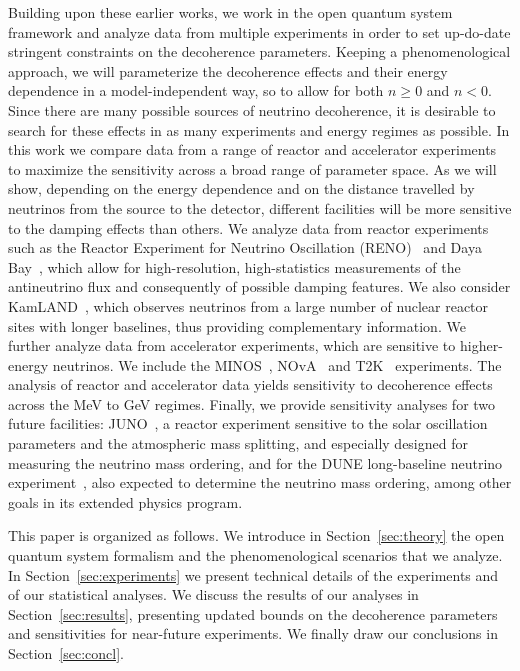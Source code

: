 \documentclass[aps, prd, onecolumn, tightenlines, notitlepage, superscriptaddress, nofootinbib, preprintnumbers, floatfix,showkeys,11pt]{revtex4-2}
\begin{document}
Building upon these earlier works, we work in the open quantum system framework and analyze data from multiple experiments in order to set up-do-date stringent constraints on the decoherence parameters. Keeping a phenomenological approach, we will parameterize the decoherence effects and their energy dependence in a model-independent way, so to allow for both $n\geq 0$ and $n < 0$. Since there are many possible sources of neutrino decoherence, it is desirable to search for these effects in as many experiments and energy regimes as possible. In this work we compare data from a range of reactor and accelerator experiments to maximize the sensitivity across a broad range of parameter space. As we will show, depending on the energy dependence and on the distance travelled by neutrinos from the source to the detector, different facilities will be more sensitive to the damping effects than others. We analyze data from reactor experiments such as the Reactor Experiment for Neutrino Oscillation (RENO)~\cite{jonghee_yoo_2020_4123573} and Daya Bay~\cite{DayaBay:2018yms}, which allow for high-resolution, high-statistics measurements of the antineutrino flux and consequently of possible damping features. We also consider KamLAND~\cite{Gando:2010aa,kamland_web}, which observes neutrinos from a large number
of nuclear reactor sites with longer baselines, thus providing complementary information. We further analyze data from accelerator experiments, which are sensitive to higher-energy neutrinos. We include the MINOS~\cite{Adamson:2017uda}, NOvA~\cite{NOvA:2018gge,NOvA:2021nfi} and T2K~\cite{Abe:2021gky} experiments. The analysis of reactor and accelerator data yields sensitivity to decoherence effects across the MeV to GeV regimes. Finally, we provide sensitivity analyses for two future facilities:  JUNO~\cite{JUNO:2015zny,JUNO:2021vlw}, a reactor experiment sensitive to the solar oscillation parameters and the atmospheric mass splitting, and especially designed for measuring the neutrino mass ordering, and for the DUNE long-baseline neutrino experiment~\cite{DUNE:2020lwj,DUNE:2020ypp,DUNE:2020mra,DUNE:2020txw}, also expected to determine the neutrino mass ordering, among other goals in its extended physics program.

This paper is organized as follows. We introduce in Section~\ref{sec:theory} the open quantum system formalism and the phenomenological scenarios that we analyze. In Section~\ref{sec:experiments} we present technical details of the experiments and of our statistical analyses. We discuss the results of our analyses in Section~\ref{sec:results}, presenting updated bounds on the decoherence parameters and sensitivities for near-future experiments. We finally draw our conclusions in Section~\ref{sec:concl}.
\end{document}
